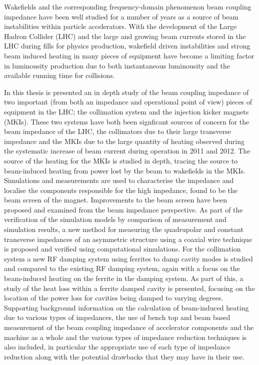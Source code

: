 Wakefields and the corresponding frequency-domain phenomenon beam coupling impedance have been well studied for a number of years as a source of beam instabilities within particle accelerators. With the development of the Large Hadron Collider (LHC) and the large and growing beam currents stored in the LHC during fills for physics production, wakefield driven instabilities and strong beam induced heating in many pieces of equipment have become a limiting factor in luminousity production due to both instantaneous luminousity and the available running time for collisions.

In this thesis is presented an in depth study of the beam coupling impedance of two important (from both an impedance and operational point of view) pieces of equipment in the LHC; the collimation system and the injection kicker magnets (MKIs). These two systems have both been signficant sources of concern for the beam impedance of the LHC, the collimators due to their large transverse impedance and the MKIs due to the large quantity of heating observed during the systematic increase of beam current during operation in 2011 and 2012. The source of the heating for the MKIs is studied in depth, tracing the source to beam-induced heating from power lost by the beam to wakefields in the MKIs. Simulations and measurements are used to characterise the impedance and localise the components responsible for the high impedance, found to be the beam screen of the magnet. Improvements to the beam screen have been proposed and examined from the beam impedance perspective. As part of the verification of the simulation models by comparison of measurement and simulation results, a new method for measuring the quadrupolar and constant transverse impedances of an asymmetric structure using a coaxial wire technique is proposed and verified using computational simulations. For the collimation system a new RF damping system using ferrites to damp cavity modes is studied and compared to the existing RF damping system, again with a focus on the beam-induced heating on the ferrite in the damping system. As part of this, a study of the heat loss within a ferrite damped cavity is presented, focusing on the location of the power loss for cavities being damped to varying degrees. Supporting background information on the calculation of beam-induced heating due to various types of impedances, the use of bench top and beam based measurement of the beam coupling impedance of accelerator components and the machine as a whole and the various types of impedance reduction techniques is also included, in particular the appropriate use of each type of impedance reduction along with the potential drawbacks that they may have in their use.